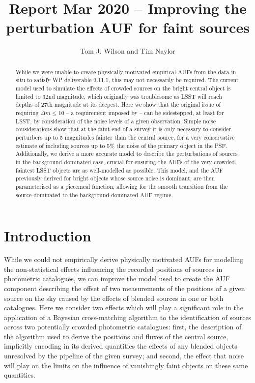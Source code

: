 \documentclass[fleqn,usenatbib]{mnras}
\title[]{Report Mar 2020 – Improving the perturbation AUF for faint sources}
\author[Tom J. Wilson and Tim Naylor]{
Tom J. Wilson
and Tim Naylor
\\
}
\date{}
\begin{document}
\label{firstpage}
\pagerange{\pageref{firstpage}--\pageref{lastpage}}
\maketitle
\begin{abstract}

While we were unable to create physically motivated empirical AUFs from the data in situ to satisfy WP deliverable 3.11.1, this may not necessarily be required. The current model used to simulate the effects of crowded sources on the bright central object is limited to 32nd magnitude, which originally was troublesome as LSST will reach depths of 27th magnitude at its deepest. Here we show that the original issue of requiring $\Delta m \leq 10$ -- a requirement imposed by \citet{2018MNRAS.481.2148W} -- can be sidestepped, at least for LSST, by consideration of the noise levels of a given observation. Simple noise considerations show that at the faint end of a survey it is only necessary to consider perturbers up to 5 magnitudes fainter than the central source, for a very conservative estimate of including sources up to 5\% the noise of the primary object in the PSF. Additionally, we derive a more accurate model to describe the perturbations of sources in the background-dominated case, crucial for ensuring the AUFs of the very crowded, faintest LSST objects are as well-modelled as possible. This model, and the AUF previously derived for bright objects whose source noise is dominant, are then parameterised as a piecemeal function, allowing for the smooth transition from the source-dominated to the background-dominated AUF regime.

\end{abstract}

\section{Introduction}
While we could not empirically derive physically motivated AUFs for modelling the non-statistical effects influencing the recorded positions of sources in photometric catalogues, we can improve the model used to create the AUF component describing the offset of two measurements of the positions of a given source on the sky caused by the effects of blended sources in one or both catalogues. Here we consider two effects which will play a significant role in the application of a Bayesian cross-matching algorithm to the identification of sources across two potentially crowded photometric catalogues: first, the description of the algorithm used to derive the positions and fluxes of the central source, implicitly encoding in its derived quantities the effects of any blended objects unresolved by the pipeline of the given survey; and second, the effect that noise will play on the limits on the influence of vanishingly faint objects on these same quantities.
\end{document}
